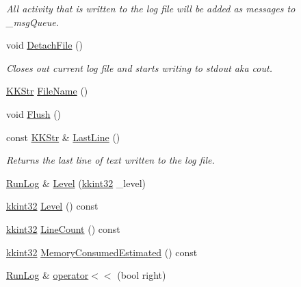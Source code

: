 \begin{DoxyCompactItemize}
\begin{DoxyCompactList}\small\item\em All activity that is written to the log file will be added as messages to \textquotesingle{}\+\_\+msg\+Queue\textquotesingle{}. \end{DoxyCompactList}\item 
void \hyperlink{class_k_k_b_1_1_run_log_a3b3bbf53f7f2ca83d0deb9b3ee919583}{Detach\+File} ()
\begin{DoxyCompactList}\small\item\em Closes out current log file and starts writing to stdout aka \textquotesingle{}cout\textquotesingle{}. \end{DoxyCompactList}\item 
\hyperlink{class_k_k_b_1_1_k_k_str}{K\+K\+Str} \hyperlink{class_k_k_b_1_1_run_log_a978817ba7ef76c2b9eb0189ca092074d}{File\+Name} ()
\item 
void \hyperlink{class_k_k_b_1_1_run_log_a91a834cb0da9906a179c80ae0a83297f}{Flush} ()
\item 
const \hyperlink{class_k_k_b_1_1_k_k_str}{K\+K\+Str} \& \hyperlink{class_k_k_b_1_1_run_log_aa84aeac15ea582fb8a6a792ef80142c3}{Last\+Line} ()
\begin{DoxyCompactList}\small\item\em Returns the last line of text written to the log file. \end{DoxyCompactList}\item 
\hyperlink{class_k_k_b_1_1_run_log}{Run\+Log} \& \hyperlink{class_k_k_b_1_1_run_log_a32cf761d7f2e747465fd80533fdbb659}{Level} (\hyperlink{namespace_k_k_b_a8fa4952cc84fda1de4bec1fbdd8d5b1b}{kkint32} \+\_\+level)
\item 
\hyperlink{namespace_k_k_b_a8fa4952cc84fda1de4bec1fbdd8d5b1b}{kkint32} \hyperlink{class_k_k_b_1_1_run_log_a5aa36d42c94e70687450a87cf1f2fcee}{Level} () const 
\item 
\hyperlink{namespace_k_k_b_a8fa4952cc84fda1de4bec1fbdd8d5b1b}{kkint32} \hyperlink{class_k_k_b_1_1_run_log_a46fdd1b20e51ce562688cd9427397b8c}{Line\+Count} () const 
\item 
\hyperlink{namespace_k_k_b_a8fa4952cc84fda1de4bec1fbdd8d5b1b}{kkint32} \hyperlink{class_k_k_b_1_1_run_log_adcc20e6263eb3e4627a10712a5b30726}{Memory\+Consumed\+Estimated} () const 
\item 
\hyperlink{class_k_k_b_1_1_run_log}{Run\+Log} \& \hyperlink{class_k_k_b_1_1_run_log_a3ce7a5e0f84e81704b0cf192a92074cb}{operator$<$$<$} (bool right)
\item 

\end{DoxyCompactItemize}
